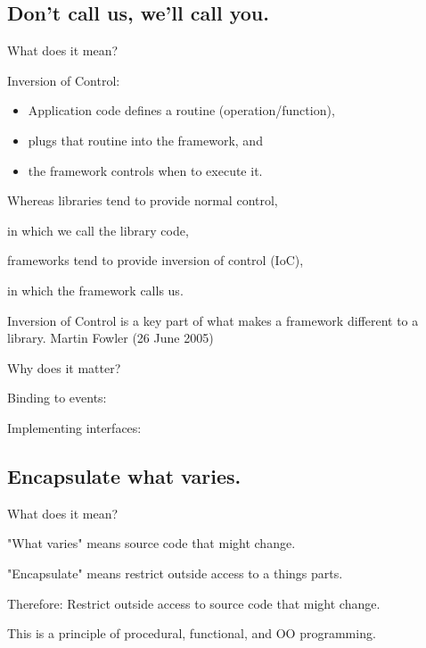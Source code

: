 \documentclass{beamer}
\begin{document}
\subsection{Don't call us, we'll call you.}

\begin{frame}{What does it mean?}
    \par Inversion of Control: 
    \begin{itemize}
        \item Application code defines a routine (operation/function),
        \item plugs that routine into the framework, and 
        \item the framework controls when to execute it.
    \end{itemize}
    \par Whereas libraries tend to provide normal control, 
    \par in which we call the library code,
    \par frameworks tend to provide inversion of control (IoC),
    \par in which the framework calls us.
\end{frame}

\begin{frame}
Inversion of Control is a key part of what makes a framework different to a library.
Martin Fowler (26 June 2005)
\end{frame}

\begin{frame}{Why does it matter?}
\end{frame}

\begin{frame}{Binding to events:}
    
\end{frame}

\begin{frame}{Implementing interfaces:}
    
\end{frame}

\subsection{Encapsulate what varies.}

\begin{frame}{What does it mean?}
    \par "What varies" means source code that might change.
    \par "Encapsulate" means restrict outside access to a things parts.
    \par Therefore: Restrict outside access to source code that might change.
    \par This is a principle of procedural, functional, and OO programming.
\end{frame}
\end{document}
